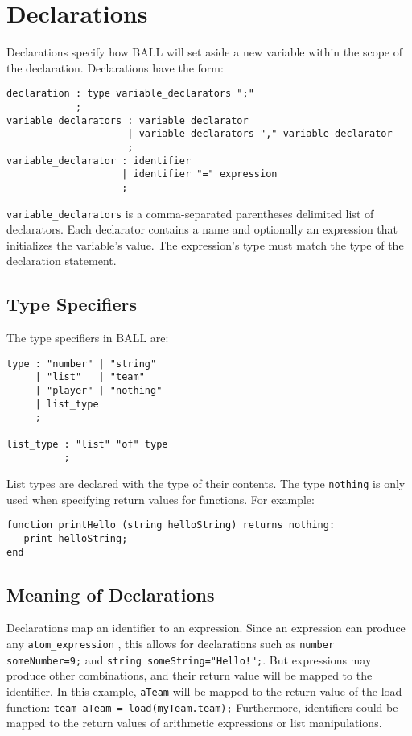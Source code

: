 
\section{Declarations}\label{Declarations}
Declarations specify how BALL will set aside a new variable within the
scope of the declaration. Declarations have the form:

\begin{verbatim}
declaration : type variable_declarators ";"
            ;
variable_declarators : variable_declarator
                     | variable_declarators "," variable_declarator
                     ;
variable_declarator : identifier
                    | identifier "=" expression
                    ;
\end{verbatim}

\texttt{variable\_declarators} is a comma-separated parentheses
delimited list of declarators. Each declarator contains a name and
optionally an expression that initializes the variable's value. The
expression's type must match the type of the declaration statement.

\subsection{Type Specifiers}

The type specifiers in BALL are: 

\begin{verbatim}
type : "number" | "string"
     | "list"   | "team"
     | "player" | "nothing"
     | list_type
     ;

list_type : "list" "of" type
          ;
\end{verbatim}

List types are declared with the type of their contents.  The type
\texttt{nothing} is only used when specifying return values for
functions. For example:

\begin{verbatim}
function printHello (string helloString) returns nothing:
   print helloString;
end
\end{verbatim}

\subsection{Meaning of Declarations}

Declarations map an identifier to an expression. Since an expression
can produce any \texttt{atom\_expression} , this allows for
declarations such as \texttt{number someNumber=9;} and \texttt{string
  someString="Hello!";}. But expressions may produce other
combinations, and their return value will be mapped to the
identifier. In this example, \texttt{aTeam} will be mapped to the
return value of the load function: \texttt{team aTeam =
  load(myTeam.team);} Furthermore, identifiers could be mapped to the
return values of arithmetic expressions or list manipulations.

